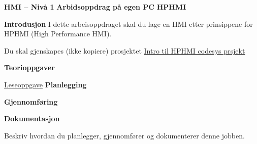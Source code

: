 

\noindent

\vskip 5pt



\vskip 5pt
\begin{center}
\textbf{HMI -- Nivå 1 }
\vskip 5pt 
\textbf{Arbidsoppdrag på egen PC}
\vskip 5pt 
\textbf{HPHMI}
\end{center}

\vskip 10pt 
\textbf{Introdusjon}
\vskip 5pt 
I dette arbeisoppdraget skal du lage en HMI etter prinsippene for HPHMI (High Performance HMI).

\vskip 5pt 
Du skal gjenskapes (ikke kopiere) prosjektet \href{https://rfka-my.sharepoint.com/:u:/g/personal/fred-olav_mosdal_skole_rogfk_no/EbxoQUSK9jxFkJX9XfhvLoMBomsgt_JP02XtAeb4RRNFrA?e=ZfVSqa}{Intro til HPHMI codesys prsjekt}
\vskip 5pt 

\vskip 5pt 


\vskip 10pt 
\textbf{Teorioppgaver}

\vskip 5pt 
\href{https://rfka-my.sharepoint.com/:b:/g/personal/fred-olav_mosdal_skole_rogfk_no/EbDgASyqKH5Ni0i6BCYnE04BaRvhWzEjRBcZw8CqgX0Mfw?e=e0zKzU}{Leseoppgave}
\vskip 10pt 
\textbf{Planlegging}


\vskip 10pt 
\textbf{Gjennomføring}

\vskip 10pt 
\textbf{Dokumentasjon}

Beskriv hvordan du planlegger, gjennomfører og dokumenterer denne jobben. 
















\vfil \eject

















